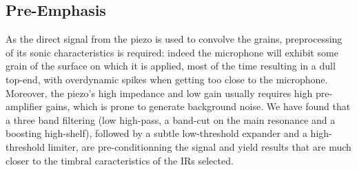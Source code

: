 \subsection{Pre-Emphasis}\label{sec:preemph}

As the direct signal from the piezo is used to convolve the grains, preprocessing of its sonic characteristics is required: indeed the microphone will exhibit some grain of the surface on which it is applied, most of the time resulting in a dull top-end, with overdynamic spikes when getting too close to the microphone. Moreover, the piezo's high impedance and low gain usually requires high pre-amplifier gains, which is prone to generate background noise. We have found that a three band filtering (low high-pass, a band-cut on the main resonance and a boosting high-shelf), followed by a subtle low-threshold expander and a high-threshold limiter, are pre-conditionning the signal and yield results that are much closer to the timbral caracteristics of the IRs selected.